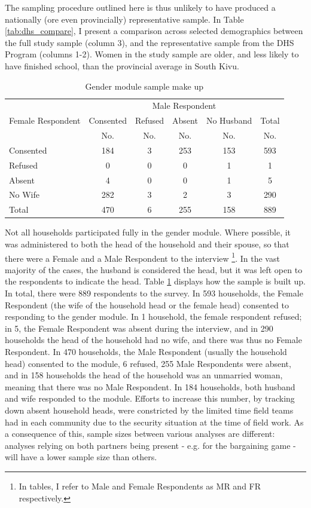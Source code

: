 The sampling procedure outlined here is thus unlikely to have produced a nationally (ore even provincially) representative sample. In Table \ref{tab:dhs_compare}, I present a comparison across selected demographics between the full study sample (column 3), and the representative sample from the DHS Program (columns 1-2). Women in the study sample are older, and less likely to have finished school, than the provincial average in South Kivu.

\begin{table}[htb]
\centering
\caption{Gender module sample make up}
\label{tab:bargsample}
\begin{tabular}{l c c c c c}
\toprule
 & \multicolumn{5}{c}{Male Respondent} \\
Female Respondent&Consented&Refused&Absent&No Husband&Total \\
&No.&No.&No.&No.&No. \\
\hline
Consented&184&3&253&153&593 \\
Refused&0&0&0&1&1 \\
Absent&4&0&0&1&5 \\
No Wife&282&3&2&3&290 \\
Total&470&6&255&158&889 \\
\bottomrule
\end{tabular}
\end{table}

Not all households participated fully in the gender module. Where possible, it was administered to both the head of the household and their spouse, so that there were a Female and a Male Respondent to the interview \footnote{In tables, I refer to Male and Female Respondents as MR and FR respectively.}. In the vast majority of the cases, the husband is considered the head, but it was left open to the respondents to indicate the head. Table \ref{tab:bargsample} displays how the sample is built up. In total, there were 889 respondents to the survey. In 593 households, the Female Respondent (the wife of the household head or the female head) consented to responding to the gender module. In 1 household, the female respondent refused; in 5, the Female Respondent was absent during the interview, and in 290 households the head of the household had no wife, and there was thus no Female Respondent. In 470 households, the Male Respondent (usually the household head) consented to the module, 6 refused, 255 Male Respondents were absent, and in 158 households the head of the household was an unmarried woman, meaning that there was no Male Respondent. In 184 households, both husband and wife responded to the module. Efforts to increase this number, by tracking down absent household heads, were constricted by the limited time field teams had in each community due to the security situation at the time of field work. As a consequence of this, sample sizes between various analyses are different: analyses relying on both partners being present - e.g. for the bargaining game - will have a lower sample size than others.

